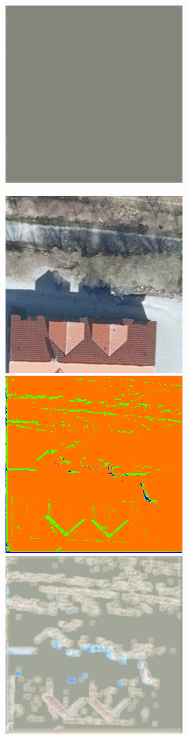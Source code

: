 \begin{figure}
    \includegraphics[width=\WnetPredictionsImageWidth]{images/wnet/46d-20/78905-restored}

    \vspace{2mm}
    \includegraphics[width=\WnetPredictionsImageWidth]{images/wnet/original/102574-image} \hfill
    \includegraphics[width=\WnetPredictionsImageWidth]{images/wnet/36d-6/102574-prediction} \hfill
    \includegraphics[width=\WnetPredictionsImageWidth]{images/wnet/36d-6/102574-restored} \hfill

\end{figure}
